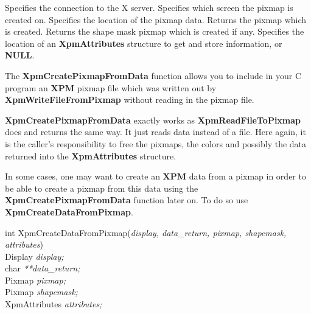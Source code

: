 \begin{description}

 Specifies the connection to the X server.
 Specifies which screen the pixmap is created on.
 Specifies the location of the pixmap data.
 Returns the pixmap which is created.
 Returns the shape mask pixmap which is created if
any.
 Specifies the location of an {\bf XpmAttributes} structure
to get and store information, or {\bf NULL}. 

\end{description} 

The {\bf XpmCreatePixmapFromData} function allows you to include in your C
program an {\bf XPM} pixmap file which was written out by {\bf
XpmWriteFileFromPixmap} without reading in the pixmap file.

{\bf XpmCreatePixmapFromData} exactly works as {\bf
Xpm\-Read\-File\-To\-Pixmap} does and returns the same way. It just reads data
instead of a file. Here again, it is the caller's responsibility to free the
pixmaps, the colors and possibly the data returned into the {\bf
XpmAttributes} structure.

\vspace{.5cm}
In some cases, one may want to create an {\bf XPM} data from a pixmap in order
to be able to create a pixmap from this data using the {\bf
XpmCreatePixmapFromData} function later on. To do so use {\bf
XpmCreateDataFromPixmap}.

\begin{flushleft}

int XpmCreateDataFromPixmap({\it display, data\_return, pixmap, shapemask,\\
\hspace{3cm}attributes})\\

\hspace{1cm}Display {\it *display;}\\
\hspace{1cm}char {\it ***data\_return;}\\
\hspace{1cm}Pixmap {\it pixmap;}\\
\hspace{1cm}Pixmap {\it shapemask;}\\
\hspace{1cm}XpmAttributes {\it *attributes;}

\end{flushleft}

